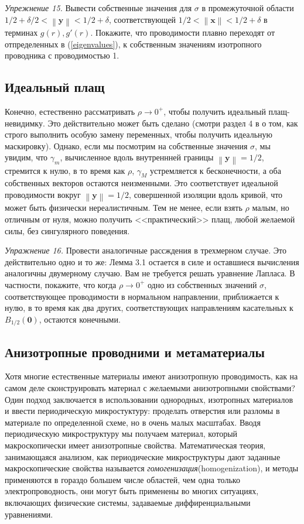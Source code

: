 \documentclass[a4paper, 12pt]{article}
\newcommand{\normb}[1]{\left\lVert\textbf{#1}\right\rVert}
\begin{document}
\textit{Упрежнение 15.} Вывести собственные значения для $\sigma$ в промежуточной
области $1/2 + \delta/2 < \normb{y} < 1/2+\delta$, соответствующей 
$1/2 < \normb{x} < 1/2+\delta$ в терминах $g(r), g'(r)$.
Покажите, что проводимости плавно переходят от отпределенных в (\ref{eigenvalues}),
к собственным значениям изотропного проводника с проводимостью 1.

\subsection{Идеальный плащ}
Конечно, естественно рассматривать $\rho \to 0^+$, чтобы получить идеальный 
плащ-невидимку. Это действительно может быть сделано (смотри раздел 4 в \cite{b13}
о том, как строго выполнить особую замену переменных, чтобы получить идеальную 
маскировку). Однако, если мы посмотрим на собственные значения $\sigma$, мы увидим,
что $\gamma_m$, вычисленное вдоль внутреннней границы $\normb{y} = 1/2$, стремится
к нулю, в то время как $\rho$, $\gamma_M$ устремляется к бесконечности, а оба 
собственных векторов остаются неизменными. Это соответствует идеальной проводимости
вокруг $\normb{y} = 1/2$, совершенной изоляции вдоль кривой, что может быть
физически нереалистичным. Тем не менее, если взять $\rho$ малым, но отличным от нуля,
можно получить <<практический>> плащ, любой желаемой силы, без сингулярного поведения.

\textit{Упражнение 16.} Провести аналогичные рассждения в трехмерном случае. Это
действительно одно и то же: Лемма 3.1 остается в силе и оставшиеся вычисления 
аналогичны двумерному случаю. Вам не требуется решать уравнение Лапласа. В частности,
покажите, что когда $\rho \to 0^+$ одно из собственных значений $\sigma$, 
соответствующее проводимости в нормальном направлении, приближается к нулю,
в то время как два других, соответствующих направлениям касательных к 
$B_{1/2}(\textbf{0})$, остаются конечными.

\subsection{Анизотропные проводними и метаматериалы}
Хотя многие естественные материалы имеют анизотропную проводимость, как на самом деле
сконструировать материал с желаемыми анизотропными свойствами? Один подход заключается
в использовании однородных, изотропных материалов и ввести периодическую 
микростуктуру: проделать отверстия или разломы в материале по определенной схеме,	
но в очень малых масштабах. Вводя периодическую микроструктуру мы получаем материал,
который макроскопически имеет анизотропные свойства. Математическая теория, 
занимающаяся анализом, как периодические микроструктуры дают заданные макроскопические
свойства называется \textit{гомогенизация}(homogenization), и методы применяются
в гораздо большем числе областей, чем одна только электропроводность, они могут
быть применены во многих ситуациях, включающих физические системы, задаваемые
диффиренциальными уравнениями.
\end{document}
